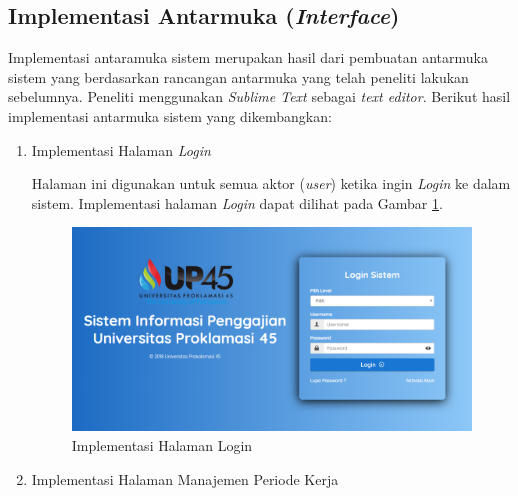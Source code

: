 	    \subsection{Implementasi Antarmuka (\emph{Interface})}
	    Implementasi antaramuka sistem merupakan hasil dari pembuatan antarmuka sistem yang berdasarkan rancangan antarmuka yang telah peneliti lakukan sebelumnya. Peneliti menggunakan \emph{Sublime Text} sebagai \emph{text editor}. Berikut hasil implementasi antarmuka sistem yang dikembangkan:
	    \begin{enumerate}
	        \itemsep0em
	        \item Implementasi Halaman \emph{Login}
	        
	        Halaman ini digunakan untuk semua aktor (\emph{user}) ketika ingin \emph{Login} ke dalam sistem. Implementasi halaman \emph{Login} dapat dilihat pada Gambar \ref{imp_hal_login}.
	        \begin{figure}[H]
                \centering
                \includegraphics[width=13cm]{gambar/halaman/halaman-login}
                \caption{Implementasi Halaman Login}
                \label{imp_hal_login}
            \end{figure}
            \item Implementasi Halaman Manajemen Periode Kerja
            

\end{enumerate}
